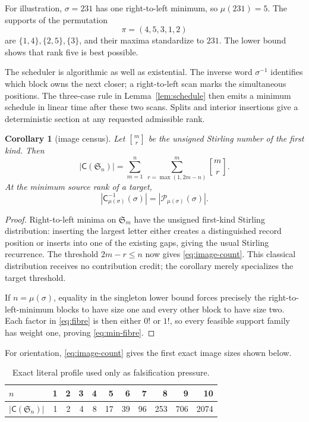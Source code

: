 \documentclass[a4paper,10pt]{amsart}
\newtheorem{corollary}[theorem]{Corollary}
\theoremstyle{remark}
\newcommand{\Sym}{\mathfrak S}
\newcommand{\CME}{\mathsf C}
\newcommand{\stirfirst}[2]{\genfrac{[}{]}{0pt}{}{#1}{#2}}
\begin{document}
For illustration, $\sigma=231$ has one right-to-left minimum, so
$\mu(231)=5$.  The supports of the permutation
\[
 \pi=(4,5,3,1,2)
\]
are $\{1,4\},\{2,5\},\{3\}$, and their maxima standardize to $231$.
The lower bound shows that rank five is best possible.

The scheduler is algorithmic as well as existential.  The inverse word
$\sigma^{-1}$ identifies which block owns the next closer; a right-to-left
scan marks the simultaneous positions.  The three-case rule in
Lemma~\ref{lem:schedule} then emits a minimum schedule in linear time after
these two scans.  Splits and interior insertions give a deterministic section
at any requested admissible rank.

\begin{corollary}[image census]\label{cor:image-count}
Let $\stirfirst{m}{r}$ be the unsigned Stirling number of the first kind.
Then
\begin{equation}\label{eq:image-count}
 |\CME(\Sym_n)|=
 \sum_{m=1}^n\ \sum_{r=\max(1,2m-n)}^m \stirfirst{m}{r}.
\end{equation}
At the minimum source rank of a target,
\begin{equation}\label{eq:min-fibre}
 |\CME_{\mu(\sigma)}^{-1}(\sigma)|
 =|\mathcal P_{\mu(\sigma)}(\sigma)|.
\end{equation}
\end{corollary}

\begin{proof}
Right-to-left minima on $\Sym_m$ have the unsigned first-kind Stirling
distribution: inserting the largest letter either creates a distinguished
record position or inserts into one of the existing gaps, giving the usual
Stirling recurrence.  The threshold $2m-r\le n$ now gives
\eqref{eq:image-count}.  This classical distribution receives no contribution
credit; the corollary merely specializes the target threshold.

If $n=\mu(\sigma)$, equality in the singleton lower bound forces precisely
the right-to-left-minimum blocks to have size one and every other block to
have size two.  Each factor in \eqref{eq:fibre} is then either $0!$ or $1!$,
so every feasible support family has weight one, proving
\eqref{eq:min-fibre}.
\end{proof}

For orientation, \eqref{eq:image-count} gives the first exact image sizes
shown below.
\begin{table}[ht]
\centering
\small
\caption{Exact literal profile used only as falsification pressure.}
\label{tab:profile}
\begin{tabular}{@{}lrrrrrrrrrr@{}}
\toprule
$n$ &1&2&3&4&5&6&7&8&9&10\\
\midrule
$|\CME(\Sym_n)|$&1&2&4&8&17&39&96&253&706&2074\\
\bottomrule
\end{tabular}
\end{table}
\end{document}
